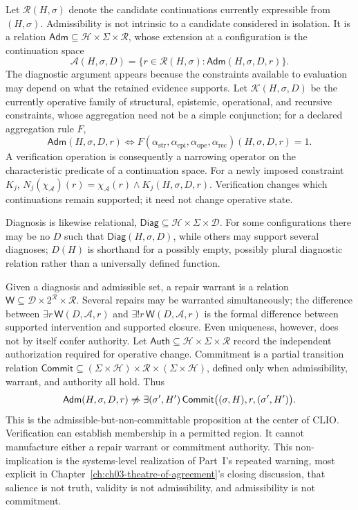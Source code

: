 Let $\mathcal{R}(H,\sigma)$ denote the candidate continuations currently expressible from $(H,\sigma)$. Admissibility is not intrinsic to a candidate considered in isolation. It is a relation $\mathsf{Adm} \subseteq \mathcal{H} \times \Sigma \times \mathcal{R}$, whose extension at a configuration is the continuation space
\[
\mathcal{A}(H,\sigma,D) = \{ r \in \mathcal{R}(H,\sigma) : \mathsf{Adm}(H,\sigma,D,r) \}.
\]
The diagnostic argument appears because the constraints available to evaluation may depend on what the retained evidence supports. Let $\mathcal{K}(H,\sigma,D)$ be the currently operative family of structural, epistemic, operational, and recursive constraints, whose aggregation need not be a simple conjunction; for a declared aggregation rule $F$,
\[
\mathsf{Adm}(H,\sigma,D,r) \iff F(\alpha_{\mathrm{str}}, \alpha_{\mathrm{epi}}, \alpha_{\mathrm{ope}}, \alpha_{\mathrm{rec}})(H,\sigma,D,r) = 1.
\]
A verification operation is consequently a narrowing operator on the characteristic predicate of a continuation space. For a newly imposed constraint $K_j$, $N_j(\chi_{\mathcal{A}})(r) = \chi_{\mathcal{A}}(r) \land K_j(H,\sigma,D,r)$. Verification changes which continuations remain supported; it need not change operative state.

Diagnosis is likewise relational, $\mathsf{Diag} \subseteq \mathcal{H} \times \Sigma \times \mathcal{D}$. For some configurations there may be no $D$ such that $\mathsf{Diag}(H,\sigma,D)$, while others may support several diagnoses; $D(H)$ is shorthand for a possibly empty, possibly plural diagnostic relation rather than a universally defined function.

Given a diagnosis and admissible set, a repair warrant is a relation $\mathsf{W} \subseteq \mathcal{D} \times 2^{\mathcal{R}} \times \mathcal{R}$. Several repairs may be warranted simultaneously; the difference between $\exists r\, \mathsf{W}(D,\mathcal{A},r)$ and $\exists! r\, \mathsf{W}(D,\mathcal{A},r)$ is the formal difference between supported intervention and supported closure. Even uniqueness, however, does not by itself confer authority. Let $\mathsf{Auth} \subseteq \mathcal{H} \times \Sigma \times \mathcal{R}$ record the independent authorization required for operative change. Commitment is a partial transition relation $\mathsf{Commit} \subseteq (\Sigma \times \mathcal{H}) \times \mathcal{R} \times (\Sigma \times \mathcal{H})$, defined only when admissibility, warrant, and authority all hold. Thus
\[
\mathsf{Adm}(H,\sigma,D,r) \centernot\Rightarrow \exists (\sigma',H')\, \mathsf{Commit}\bigl((\sigma,H), r, (\sigma',H')\bigr).
\]
This is the admissible-but-non-committable proposition at the center of CLIO. Verification can establish membership in a permitted region. It cannot manufacture either a repair warrant or commitment authority. This non-implication is the systems-level realization of Part~I's repeated warning, most explicit in Chapter~\ref{ch:ch03-theatre-of-agreement}'s closing discussion, that salience is not truth, validity is not admissibility, and admissibility is not commitment.

